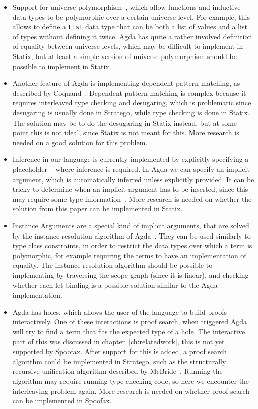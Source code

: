 \begin{itemize}
	\item Support for universe polymorphism~\cite[Universe Levels]{agda}, which allow functions and inductive data types to be polymorphic over a certain universe level. For example, this allows to define a \verb|List| data type that can be both a list of values and a list of types without defining it twice. Agda has quite a rather involved definition of equality between universe levels, which may be difficult to implement in Statix, but at least a simple version of universe polymorphism should be possible to implement in Statix.
	\item Another feature of Agda is implementing dependent pattern matching, as described by Coquand~\cite{patternmatching}. Dependent pattern matching is complex because it requires interleaved type checking and desugaring, which is problematic since desugaring is usually done in Stratego, while type checking is done in Statix. The solution may be to do the desugaring in Statix instead, but at some point this is not ideal, since Statix is not meant for this. More research is needed on a good solution for this problem.
	\item Inference in our language is currently implemented by explicitly specifying a placeholder \verb|_| where inference is required. In Agda we can specify an implicit argument, which is automatically inferred unless explicitly provided. It can be tricky to determine when an implicit argument has to be inserted, since this may require some type information~\cite{implicit_arguments}. More research is needed on whether the solution from this paper can be implemented in Statix.
	\item Instance Arguments are a special kind of implicit arguments, that are solved by the instance resolution algorithm of Agda~\cite[Instance Arguments]{agda}. They can be used similarly to type class constraints, in order to restrict the data types over which a term is polymorphic, for example requiring the terms to have an implementation of equality. The instance resolution algorithm should be possible to implementing by traversing the scope graph (since it is linear), and checking whether each let binding is a possible solution similar to the Agda implementation. 
	\item Agda has holes, which allows the user of the language to build proofs interactively. One of these interactions is proof search, when triggered Agda will try to find a term that fits the expected type of a hole. The interactive part of this was discussed in chapter~\ref{ch:relatedwork}, this is not yet supported by Spoofax. After support for this is added, a proof search algorithm could be implemented in Stratego, such as the structurally recursive unification algorithm described by McBride~\cite{proofsearch}. Running the algorithm may require running type checking code, so here we encounter the interleaving problem again. More research is needed on whether proof search can be implemented in Spoofax.

\end{itemize}
